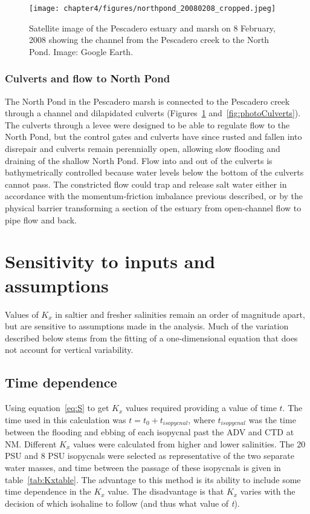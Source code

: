 \begin{figure}
\centering
	\texttt{[image: chapter4/figures/northpond\_20080208\_cropped.jpeg]}
	\caption{Satellite image of the Pescadero estuary and marsh on 8 February, 2008 showing the channel from the Pescadero creek to the North Pond. Image: Google Earth.} \label{fig:geNP}
\end{figure}

\subsubsection{Culverts and flow to North Pond}
The North Pond in the Pescadero marsh is connected to the Pescadero creek through a channel and dilapidated culverts (Figures~\ref{fig:geNP} and~\ref{fig:photoCulverts}). The culverts through a levee were designed to be able to regulate flow to the North Pond, but the control gates and culverts have since rusted and fallen into disrepair and culverts remain perennially open, allowing slow flooding and draining of the shallow North Pond. Flow into and out of the culverts is bathymetrically controlled because water levels below the bottom of the culverts cannot pass. The constricted flow could trap and release salt water either in accordance with the momentum-friction imbalance previous described, or by the physical barrier transforming a section of the estuary from open-channel flow to pipe flow and back. 





\section{Sensitivity to inputs and assumptions} \label{sec:Sensitivity}

Values of $K_x$ in saltier and fresher salinities remain an order of magnitude apart, but are sensitive to assumptions made in the analysis. Much of the variation described below stems from the fitting of a one-dimensional equation that does not account for vertical variability. 

\subsection{Time dependence}

Using equation~\ref{eq:S} to get $K_x$ values required providing a value of time $t$. The time used in this calculation was $t=t_0 + t_{isopycnal}$, where $t_{isopycnal}$ was the time between the flooding and ebbing of each isopycnal past the ADV and CTD at NM. Different $K_x$ values were calculated from higher and lower salinities. The 20 PSU and 8 PSU isopycnals were selected as representative of the two separate water masses, and time between the passage of these isopycnals is given in table~\ref{tab:Kxtable}. The advantage to this method is its ability to include some time dependence in the $K_x$ value. The disadvantage is that $K_x$ varies with the decision of which isohaline to follow (and thus what value of \emph{t}). 


